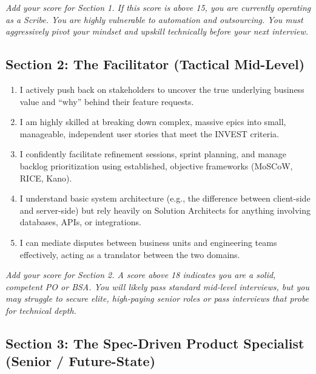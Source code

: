 \emph{Add your score for Section 1. If this score is above 15, you are
currently operating as a Scribe. You are highly vulnerable to automation
and outsourcing. You must aggressively pivot your mindset and upskill
technically before your next interview.}

\subsection{Section 2: The Facilitator (Tactical
Mid-Level)}\label{section-2-the-facilitator-tactical-mid-level}

\begin{enumerate}
\def\labelenumi{\arabic{enumi}.}
\tightlist
\item
  I actively push back on stakeholders to uncover the true underlying
  business value and ``why'' behind their feature requests.
\item
  I am highly skilled at breaking down complex, massive epics into
  small, manageable, independent user stories that meet the INVEST
  criteria.
\item
  I confidently facilitate refinement sessions, sprint planning, and
  manage backlog prioritization using established, objective frameworks
  (MoSCoW, RICE, Kano).
\item
  I understand basic system architecture (e.g., the difference between
  client-side and server-side) but rely heavily on Solution Architects
  for anything involving databases, APIs, or integrations.
\item
  I can mediate disputes between business units and engineering teams
  effectively, acting as a translator between the two domains.
\end{enumerate}

\emph{Add your score for Section 2. A score above 18 indicates you are a
solid, competent PO or BSA. You will likely pass standard mid-level
interviews, but you may struggle to secure elite, high-paying senior
roles or pass interviews that probe for technical depth.}

\subsection{Section 3: The Spec-Driven Product Specialist (Senior /
Future-State)}\label{section-3-the-spec-driven-product-specialist-senior-future-state}

